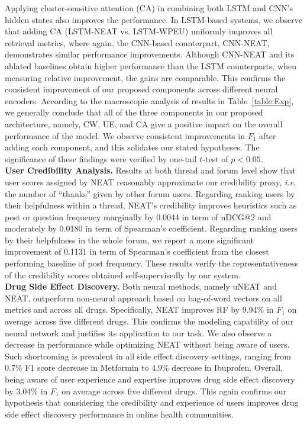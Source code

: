 \documentclass{bmcart}
\begin{document}
Applying cluster-sensitive attention (CA) in combining both LSTM and CNN's
hidden states also improves the performance. In LSTM-based systems, we observe 
that adding CA (LSTM-NEAT vs. LSTM-WPEU) uniformly improves all retrieval metrics, where again, the CNN-based counterpart,
CNN-NEAT, demonstrates similar performance improvements. Although CNN-NEAT and its ablated baselines obtain higher performance than the LSTM counterparts, when measuring relative improvement, the gains are comparable. This confirms the consistent improvement of our proposed components across different neural encoders. According to the macroscopic analysis of results in
Table~\ref{table:Exp}, we generally conclude that all of the three components in our proposed architecture, namely, CW, UE, and
CA give a positive impact on the overall performance of the
model. We observe consistent improvements in $F_1$ after adding each component, and this solidates our stated hypotheses. The significance of these findings were verified by one-tail $t$-test of $p < 0.05$. \\

{\bf User Credibility Analysis.}
Results at both thread and forum level show that user scores assigned by NEAT reasonably approximate our credibility proxy, \textit{i.e.} the number of ``thanks'' given by other forum users. Regarding ranking users by their helpfulness within a thread, NEAT's credibility improves heuristics such as post or question frequency marginally by 0.0044 in term of nDCG@2 and moderately by 0.0180 in term of Spearman's coefficient. Regarding ranking users by their helpfulness in the whole forum, we report a more significant improvement of 0.1131 in term of Spearman's coefficient from the closest performing baseline of post frequency. These results verify the representativeness of the credibility scores obtained self-supervisedly by our system. \\

{\bf Drug Side Effect Discovery.}
Both neural methods, namely uNEAT and NEAT, outperform non-neural approach based on bag-of-word vectors on all metrics and across all drugs. Specifically, NEAT improves RF by 9.94\% in $F_1$ on average across five different drugs. This confirms the modeling capability of our neural network and justifies its application to our task. We also observe a decrease in performance while optimizing 
NEAT without being aware of users. Such shortcoming is prevalent in all side effect discovery settings, ranging from 0.7\% F1 score decrease in Metformin to 4.9\% decrease in Ibuprofen. Overall, being aware of user experience and expertise improves drug side effect discovery by 3.04\% in $F_1$ on average across five different drugs. This again confirms our hypothesis that considering the credibility and experience of users improves drug side effect discovery performance in online health communities. \\
\end{document}
